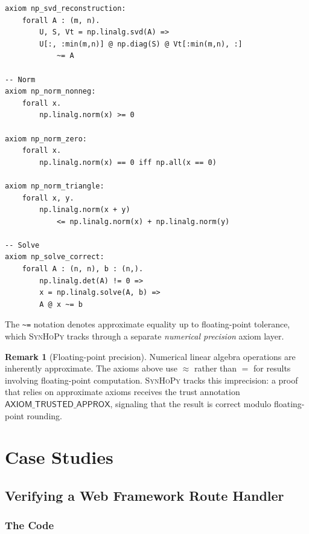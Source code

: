 \documentclass[11pt,a4paper]{report}
\theoremstyle{definition}
\newtheorem{remark}[definition]{Remark}
\theoremstyle{plain}
\newcommand{\synhopy}{\textsc{SynHoPy}}
\begin{document}
\begin{lstlisting}[style=proof]
axiom np_svd_reconstruction:
    forall A : (m, n).
        U, S, Vt = np.linalg.svd(A) =>
        U[:, :min(m,n)] @ np.diag(S) @ Vt[:min(m,n), :]
            ~= A

-- Norm
axiom np_norm_nonneg:
    forall x.
        np.linalg.norm(x) >= 0

axiom np_norm_zero:
    forall x.
        np.linalg.norm(x) == 0 iff np.all(x == 0)

axiom np_norm_triangle:
    forall x, y.
        np.linalg.norm(x + y)
            <= np.linalg.norm(x) + np.linalg.norm(y)

-- Solve
axiom np_solve_correct:
    forall A : (n, n), b : (n,).
        np.linalg.det(A) != 0 =>
        x = np.linalg.solve(A, b) =>
        A @ x ~= b
\end{lstlisting}

The \texttt{\~{}=} notation denotes approximate equality up to floating-point
tolerance, which \synhopy{} tracks through a separate \emph{numerical
precision} axiom layer.

\begin{remark}[Floating-point precision]
Numerical linear algebra operations are inherently approximate.  The
axioms above use $\approx$ rather than $=$ for results involving
floating-point computation.  \synhopy{} tracks this imprecision: a proof
that relies on approximate axioms receives the trust annotation
$\mathsf{AXIOM\_TRUSTED\_APPROX}$, signaling that the result is correct
modulo floating-point rounding.
\end{remark}



\part{Case Studies}

\chapter{Verifying a Web Framework Route Handler}
\label{ch:case-web}

\section{The Code}
\end{document}
